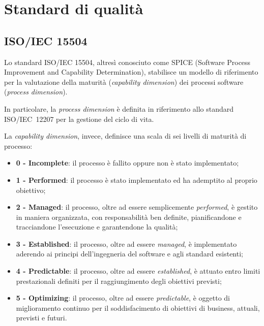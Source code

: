 \section{Standard di qualità} \label{std qualita}
\label{app:standard}
\subsection{ISO/IEC 15504}
Lo standard ISO/IEC 15504, altresì conosciuto come SPICE (Software Process Improvement and Capability Determination), stabilisce un modello di riferimento per la valutazione della maturità (\textit{capability dimension}) dei processi software (\textit{process dimension}).

In particolare, la \textit{process dimension} è definita in riferimento allo standard \mbox{ISO/IEC 12207} per la gestione del ciclo di vita.

La \textit{capability dimension}, invece, definisce una scala di sei livelli di maturità di processo:
\begin{itemize}
\item \textbf{0 - Incomplete}: il processo è  fallito oppure non è stato implementato;
\item \textbf{1 - Performed}: il processo  è stato implementato ed ha ademptito al proprio obiettivo;
\item \textbf{2 - Managed}: il processo, oltre ad essere semplicemente \textit{performed}, è gestito in maniera organizzata, con responsabilità ben definite, pianificandone e tracciandone l'esecuzione e garantendone la qualità;
\item \textbf{3 - Established}: il processo, oltre ad essere \textit{managed}, è implementato aderendo ai principi dell'ingegneria del software e agli standard esistenti;
\item \textbf{4 - Predictable}: il processo, oltre ad essere \textit{established}, è attuato entro limiti prestazionali definiti per il raggiungimento degli obiettivi previsti;
\item \textbf{5 - Optimizing}: il processo, oltre ad essere \textit{predictable}, è oggetto di miglioramento continuo per il soddisfacimento di obiettivi di business, attuali, previsti e futuri.
\end{itemize}

